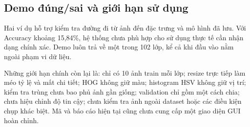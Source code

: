 \subsection{Demo đúng/sai và giới hạn sử dụng}
Hai ví dụ hỗ trợ kiểm tra đường đi từ ảnh đến đặc trưng và mô hình đã lưu. Với Accuracy khoảng 15,84\%, hệ thống chưa phù hợp cho sử dụng thực tế cần nhận dạng chính xác. Demo luôn trả về một trong 102 lớp, kể cả khi đầu vào nằm ngoài phạm vi dữ liệu.

Những giới hạn chính còn lại là: chỉ có 10 ảnh train mỗi lớp; resize trực tiếp làm méo tỷ lệ và mất chi tiết; HOG không giữ màu; histogram HSV không giữ vị trí; kiểm tra trùng chưa bao phủ ảnh gần giống; validation chỉ gồm một cách chia; chưa hiệu chỉnh độ tin cậy; chưa kiểm tra ảnh ngoài dataset hoặc các điều kiện chụp khác biệt. Mã và báo cáo hiện tại cũng chưa cung cấp một giao diện GUI hoàn chỉnh.
